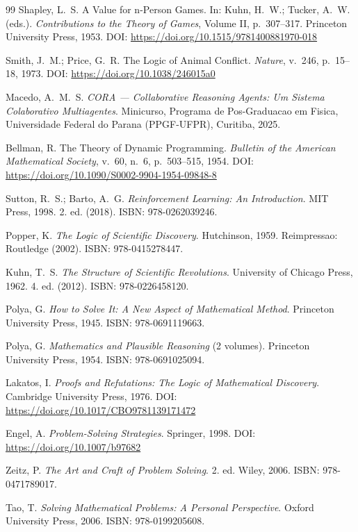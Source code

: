 \documentclass[5p]{elsarticle}
\begin{document}
\begin{thebibliography}{99}
Shapley, L.~S. A Value for n-Person Games. In: Kuhn, H.~W.; Tucker, A.~W. (eds.). \textit{Contributions to the Theory of Games}, Volume II, p.~307--317. Princeton University Press, 1953. DOI: \url{https://doi.org/10.1515/9781400881970-018}

Smith, J.~M.; Price, G.~R. The Logic of Animal Conflict. \textit{Nature}, v.~246, p.~15--18, 1973. DOI: \url{https://doi.org/10.1038/246015a0}

Macedo, A.~M.~S. \textit{CORA --- Collaborative Reasoning Agents: Um Sistema Colaborativo Multiagentes}. Minicurso, Programa de Pos-Graduacao em Fisica, Universidade Federal do Parana (PPGF-UFPR), Curitiba, 2025.

Bellman, R. The Theory of Dynamic Programming. \textit{Bulletin of the American Mathematical Society}, v.~60, n.~6, p.~503--515, 1954. DOI: \url{https://doi.org/10.1090/S0002-9904-1954-09848-8}

Sutton, R.~S.; Barto, A.~G. \textit{Reinforcement Learning: An Introduction}. MIT Press, 1998. 2. ed. (2018). ISBN: 978-0262039246.

Popper, K. \textit{The Logic of Scientific Discovery}. Hutchinson, 1959. Reimpressao: Routledge (2002). ISBN: 978-0415278447.

Kuhn, T.~S. \textit{The Structure of Scientific Revolutions}. University of Chicago Press, 1962. 4. ed. (2012). ISBN: 978-0226458120.

Polya, G. \textit{How to Solve It: A New Aspect of Mathematical Method}. Princeton University Press, 1945. ISBN: 978-0691119663.

Polya, G. \textit{Mathematics and Plausible Reasoning} (2 volumes). Princeton University Press, 1954. ISBN: 978-0691025094.

Lakatos, I. \textit{Proofs and Refutations: The Logic of Mathematical Discovery}. Cambridge University Press, 1976. DOI: \url{https://doi.org/10.1017/CBO9781139171472}

Engel, A. \textit{Problem-Solving Strategies}. Springer, 1998. DOI: \url{https://doi.org/10.1007/b97682}

Zeitz, P. \textit{The Art and Craft of Problem Solving}. 2. ed. Wiley, 2006. ISBN: 978-0471789017.

Tao, T. \textit{Solving Mathematical Problems: A Personal Perspective}. Oxford University Press, 2006. ISBN: 978-0199205608.


\end{thebibliography}
\end{document}
